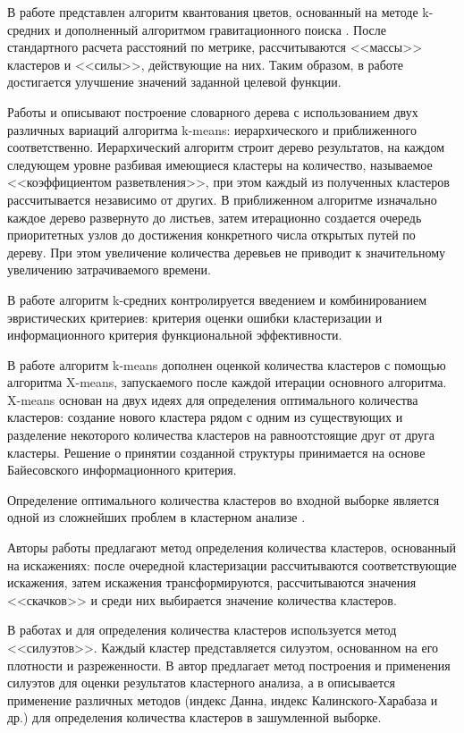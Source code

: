 В работе \cite{lenka} представлен алгоритм квантования цветов, основанный на методе k-средних и дополненный алгоритмом гравитационного поиска \cite{lenka8}. После стандартного расчета расстояний по метрике, рассчитываются <<массы>> кластеров и <<силы>>, действующие на них. Таким образом, в работе достигается улучшение значений заданной целевой функции.

Работы \cite{nister} и \cite{philbin} описывают построение словарного дерева с использованием двух различных вариаций алгоритма k-means: иерархического и приближенного соответственно. Иерархический алгоритм строит дерево результатов, на каждом следующем уровне разбивая имеющиеся кластеры на количество, называемое <<коэффициентом разветвления>>, при этом каждый из полученных кластеров рассчитывается независимо от других. В приближенном алгоритме изначально каждое дерево развернуто до листьев, затем итерационно создается очередь приоритетных узлов до достижения конкретного числа открытых путей по дереву. При этом увеличение количества деревьев не приводит к значительному увеличению затрачиваемого времени.

В работе \cite{ukraine} алгоритм k-средних контролируется введением и комбинированием эвристических критериев: критерия оценки ошибки кластеризации и информационного критерия функциональной эффективности.

В работе \cite{xmeans} алгоритм k-means дополнен оценкой количества кластеров с помощью алгоритма X-means, запускаемого после каждой итерации основного алгоритма. X-means основан на двух идеях для определения оптимального количества кластеров: создание нового кластера рядом с одним из существующих и разделение некоторого количества кластеров на равноотстоящие друг от друга кластеры. Решение о принятии созданной структуры принимается на основе Байесовского информационного критерия.

Определение оптимального количества кластеров во входной выборке является одной из сложнейших проблем в кластерном анализе \cite{kpp, xmeans, numbers, silhouettes, rescale}.

Авторы работы \cite{numbers} предлагают метод определения количества кластеров, основанный на искажениях: после очередной кластеризации рассчитываются соответствующие искажения, затем искажения трансформируются, рассчитываются значения <<скачков>> и среди них выбирается значение количества кластеров.

В работах \cite{silhouettes} и \cite{rescale} для определения количества кластеров используется метод <<силуэтов>>. Каждый кластер представляется силуэтом, основанном на его плотности и разреженности. В \cite{silhouettes} автор предлагает метод построения и применения силуэтов для оценки результатов кластерного анализа, а в \cite{rescale} описывается применение различных методов (индекс Данна, индекс Калинского-Харабаза и др.) для определения количества кластеров в зашумленной выборке.


